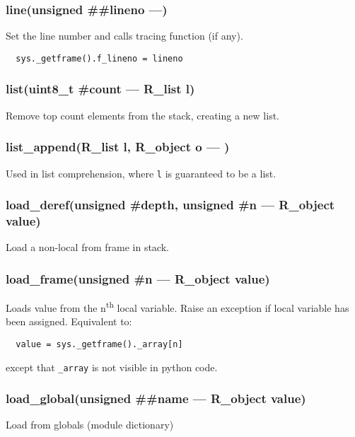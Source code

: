 \subsubsection{line(unsigned \#\#lineno ---)}
\vspace{-1em}Set the line number and calls tracing function (if any). \vspace{-1em}\begin{verbatim}
  sys._getframe().f_lineno = lineno
\end{verbatim}
\vspace{-1em}\vspace{-1em}
\subsubsection{list(uint8\_t \#count --- R\_list l)}
\vspace{-1em}Remove top count elements from the stack, creating a new list. \vspace{-1em}
\subsubsection{list\_append(R\_list l, R\_object o --- )}
\vspace{-1em}Used in list comprehension, where \texttt{l} is guaranteed to be a list. \vspace{-1em}
\subsubsection{load\_deref(unsigned \#depth, unsigned \#n --- R\_object value)}
\vspace{-1em}Load a non-local from frame in stack. \vspace{-1em}
\subsubsection{load\_frame(unsigned \#n --- R\_object value)}
\vspace{-1em}Loads value from the n\textsuperscript{th} local variable. Raise an exception if local variable has been assigned. Equivalent to: \vspace{-1em}\begin{verbatim}
  value = sys._getframe()._array[n]
\end{verbatim}
\vspace{-1em}except that \texttt{\_array} is not visible in python code. \vspace{-1em}
\subsubsection{load\_global(unsigned \#\#name --- R\_object value) }
\vspace{-1em}Load from globals (module dictionary) \vspace{-1em}
